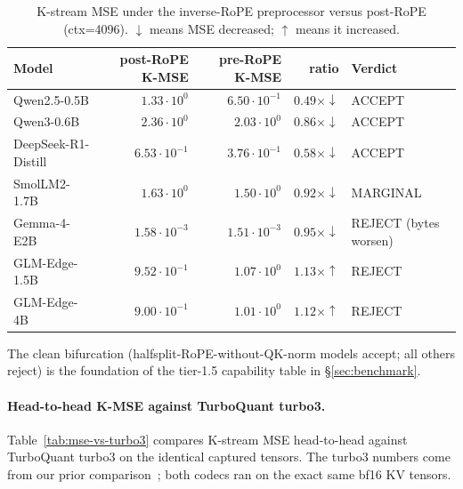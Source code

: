 \documentclass[11pt,a4paper]{article}
\theoremstyle{definition}
\theoremstyle{plain}
\begin{document}
\begin{table}[H]
\centering
\small
\caption{K-stream MSE under the inverse-RoPE preprocessor versus post-RoPE (ctx=4096). $\downarrow$ means MSE decreased; $\uparrow$ means it increased.}
\label{tab:mse-rope}
\begin{tabular}{lrrrl}
  \toprule
  Model & post-RoPE K-MSE & pre-RoPE K-MSE & ratio & Verdict \\
  \midrule
  Qwen2.5-0.5B                  & $1.33\!\cdot\!10^{0}$  & $6.50\!\cdot\!10^{-1}$ & $0.49\times\downarrow$  & ACCEPT \\
  Qwen3-0.6B                    & $2.36\!\cdot\!10^{0}$  & $2.03\!\cdot\!10^{0}$  & $0.86\times\downarrow$  & ACCEPT \\
  DeepSeek-R1-Distill           & $6.53\!\cdot\!10^{-1}$ & $3.76\!\cdot\!10^{-1}$ & $0.58\times\downarrow$  & ACCEPT \\
  SmolLM2-1.7B                  & $1.63\!\cdot\!10^{0}$  & $1.50\!\cdot\!10^{0}$  & $0.92\times\downarrow$  & MARGINAL \\
  Gemma-4-E2B                   & $1.58\!\cdot\!10^{-3}$ & $1.51\!\cdot\!10^{-3}$ & $0.95\times\downarrow$  & REJECT (bytes worsen) \\
  GLM-Edge-1.5B                 & $9.52\!\cdot\!10^{-1}$ & $1.07\!\cdot\!10^{0}$  & $1.13\times\uparrow$    & REJECT \\
  GLM-Edge-4B                   & $9.00\!\cdot\!10^{-1}$ & $1.01\!\cdot\!10^{0}$  & $1.12\times\uparrow$    & REJECT \\
  \bottomrule
\end{tabular}
\end{table}

The clean bifurcation (halfsplit-RoPE-without-QK-norm models accept; all others reject) is the foundation of the tier-1.5 capability table in \S\ref{sec:benchmark}.

\paragraph{Head-to-head K-MSE against TurboQuant turbo3.}
Table~\ref{tab:mse-vs-turbo3} compares K-stream MSE head-to-head against TurboQuant turbo3 on the identical captured tensors. The turbo3 numbers come from our prior comparison~\cite{kakeya-kv}; both codecs ran on the exact same bf16 KV tensors.
\end{document}

